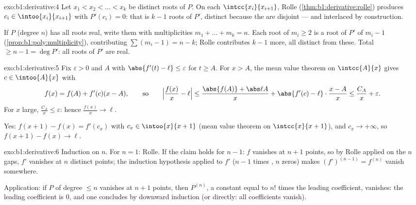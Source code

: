 \begin{solution}{exo:b1:derivative:4}
Let $x_1 < x_2 < \dots < x_k$ be distinct roots of $P$. On each
$\intcc{x_i}{x_{i+1}}$, Rolle (\cref{thm:b1:derivative:rolle})
produces $c_i \in \intoo{x_i}{x_{i+1}}$ with $P'(c_i) = 0$: that is
$k - 1$ roots of $P'$, distinct because the   are
disjoint --- and interlaced by construction.

If $P$ (degree $n$) has all roots real, write them with
multiplicities $m_1 + \dots + m_k = n$. Each root of 
$m_i \geq 2$ is a root of $P'$ of  $m_i - 1$
(\cref{prop:b1:poly:multiplicity}), contributing $\sum (m_i - 1) = n
- k$; Rolle contributes $k - 1$ more, all distinct from these. Total
$\geq n - 1 = \deg P'$: all roots of $P'$ are real.
\end{solution}

\begin{solution}{exo:b1:derivative:5}
Fix $\varepsilon > 0$ and $A$ with $\abs{f'(t) - \ell} \leq
\varepsilon$ for $t \geq A$. For $x > A$, the mean value theorem on
$\intcc{A}{x}$ gives $c \in \intoo{A}{x}$ with
\[
f(x) = f(A) + f'(c)(x - A),
\qquad\text{so}\qquad
\Bigl|\frac{f(x)}{x} - \ell\Bigr|
\leq \frac{\abs{f(A)} + \abs\ell A}{x} + \abs{f'(c) - \ell}
\cdot\frac{x - A}{x} \leq \frac{C_A}{x} + \varepsilon .
\]
For $x$ large, $\frac{C_A}{x} \leq \varepsilon$: hence
$\frac{f(x)}{x} \to \ell$.

Yes: $f(x+1) - f(x) = f'(c_x)$ with $c_x \in \intoo{x}{x+1}$ (mean
value theorem on $\intcc{x}{x+1}$), and $c_x \to +\infty$, so
$f(x+1) - f(x) \to \ell$.
\end{solution}

\begin{solution}{exo:b1:derivative:6}
Induction on $n$. For $n = 1$: Rolle. If the claim holds for $n - 1$:
$f$ vanishes at $n+1$ points, so by Rolle applied on the $n$ gaps,
$f'$ vanishes at $n$ distinct points; the induction hypothesis
applied to $f'$ ($n-1$ times , $n$ zeros) makes
$(f')^{(n-1)} = f^{(n)}$ vanish somewhere.

Application: if $P$ of degree $\leq n$ vanishes at $n+1$ points, then
$P^{(n)}$, a constant equal to $n!$ times the leading coefficient,
vanishes: the leading coefficient is $0$, and one concludes by
downward induction (or directly: all coefficients vanish).
\end{solution}

